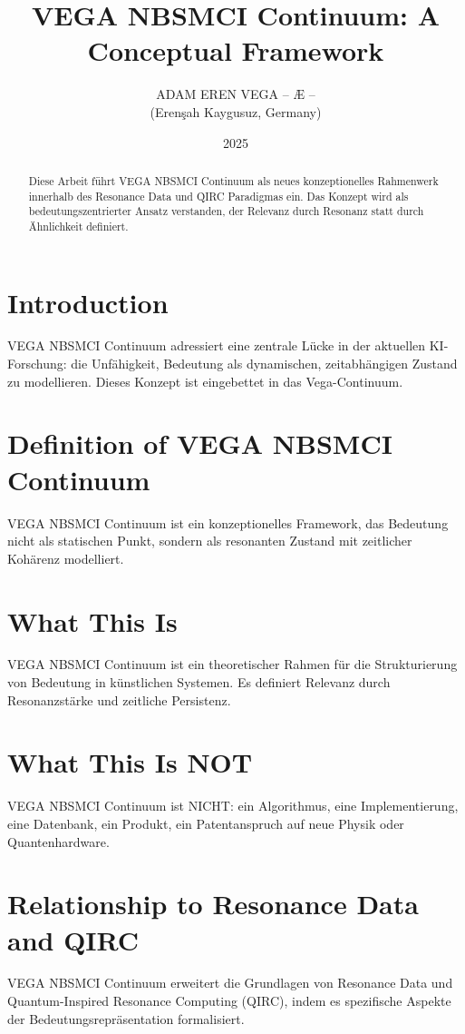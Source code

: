 \documentclass[12pt,a4paper]{article}
\title{VEGA NBSMCI Continuum: A Conceptual Framework}
\author{ADAM EREN VEGA – Æ – \\ (Erenşah Kaygusuz, Germany)}
\date{2025}
\begin{document}
\maketitle

\begin{abstract}
Diese Arbeit führt VEGA NBSMCI Continuum als neues konzeptionelles Rahmenwerk innerhalb des Resonance Data und QIRC Paradigmas ein. Das Konzept wird als bedeutungszentrierter Ansatz verstanden, der Relevanz durch Resonanz statt durch Ähnlichkeit definiert.
\end{abstract}

\section{Introduction}
VEGA NBSMCI Continuum adressiert eine zentrale Lücke in der aktuellen KI-Forschung: die Unfähigkeit, Bedeutung als dynamischen, zeitabhängigen Zustand zu modellieren. Dieses Konzept ist eingebettet in das Vega-Continuum.

\section{Definition of VEGA NBSMCI Continuum}
VEGA NBSMCI Continuum ist ein konzeptionelles Framework, das Bedeutung nicht als statischen Punkt, sondern als resonanten Zustand mit zeitlicher Kohärenz modelliert.

\section{What This Is}
VEGA NBSMCI Continuum ist ein theoretischer Rahmen für die Strukturierung von Bedeutung in künstlichen Systemen. Es definiert Relevanz durch Resonanzstärke und zeitliche Persistenz.

\section{What This Is NOT}
VEGA NBSMCI Continuum ist NICHT: ein Algorithmus, eine Implementierung, eine Datenbank, ein Produkt, ein Patentanspruch auf neue Physik oder Quantenhardware.

\section{Relationship to Resonance Data and QIRC}
VEGA NBSMCI Continuum erweitert die Grundlagen von Resonance Data und Quantum-Inspired Resonance Computing (QIRC), indem es spezifische Aspekte der Bedeutungsrepräsentation formalisiert.
\end{document}

